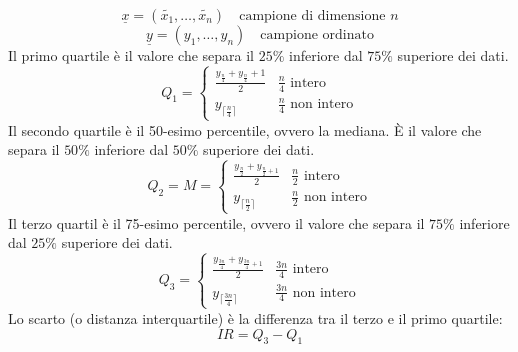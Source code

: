 \documentclass[a4paper]{article}
\theoremstyle{break}
\theoremstyle{break}
\theoremstyle{break}
\theoremstyle{break}
\begin{document}
\begin{itemize}
\begin{figure}[H]
\begin{tikzpicture}
      \end{tikzpicture}
    \end{figure}
    \[
      \underline{x} = (\tilde{x_1}, \ldots, \tilde{x_n}) \quad \text{campione di dimensione } n
    \]
    \[
      \underline{y} = (y_1, \ldots, y_n) \quad \text{campione ordinato}
    \]
    Il primo quartile è il valore che separa il \( 25\% \) inferiore dal \( 75\% \) superiore
    dei dati.
    \[
      Q_1 = \begin{cases}
        \frac{y_\frac{n}{4} + y_\frac{n}{4}+1}{2} & \frac{n}{4} \text{  intero}    \\
        y_{\lceil \frac{n}{4} \rceil}             & \frac{n}{4} \text{ non intero}
      \end{cases}
    \]
    Il secondo quartile è il 50-esimo percentile, ovvero la mediana. È il valore che separa
    il \( 50\% \) inferiore dal \( 50\% \) superiore dei dati.
    \[
      Q_2 = M = \begin{cases}
        \frac{y_{\frac{n}{2}} + y_{\frac{n}{2}+1}}{2} & \frac{n}{2} \text{  intero}    \\
        y_{\lceil \frac{n}{2} \rceil}                 & \frac{n}{2} \text{ non intero}
      \end{cases}
    \]
    Il terzo quartil è il 75-esimo percentile, ovvero il valore che separa il \( 75\% \)
    inferiore dal \( 25\% \) superiore dei dati.
    \[
      Q_3 = \begin{cases}
        \frac{y_{\frac{3n}{4}} + y_{\frac{3n}{4}+1}}{2} & \frac{3n}{4} \text{  intero}    \\
        y_{\lceil \frac{3n}{4} \rceil}                  & \frac{3n}{4} \text{ non intero}
      \end{cases}
    \]
    Lo scarto (o distanza interquartile) è la differenza tra il terzo e il primo quartile:
    \[
      IR = Q_3 - Q_1
    \]
\end{itemize}
\end{document}
